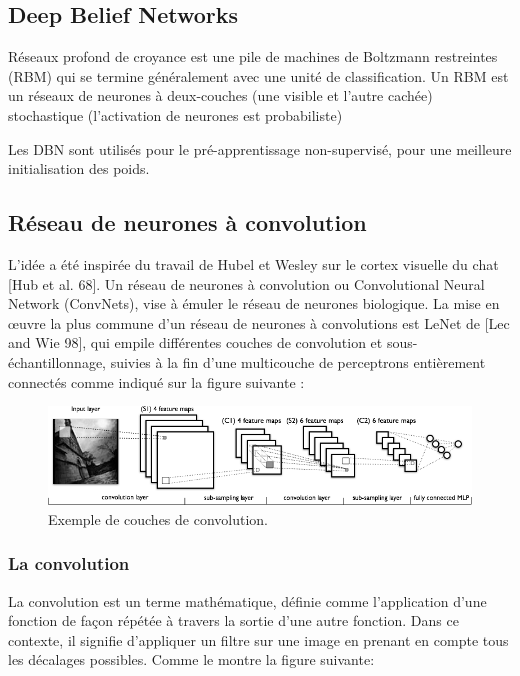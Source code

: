 \subsection{Deep Belief Networks}

Réseaux profond de croyance est une pile de machines de Boltzmann restreintes (RBM) qui se termine généralement avec une unité de classification. Un RBM est un réseaux de neurones à deux-couches (une visible et l'autre cachée) stochastique (l'activation de neurones est probabiliste)

Les DBN sont utilisés pour le pré-apprentissage non-supervisé, pour une meilleure initialisation des poids.



\subsection{Réseau de neurones à convolution}
L'idée a été inspirée du travail de Hubel et Wesley sur le cortex visuelle du chat [Hub et al. 68]. Un réseau de neurones à convolution ou Convolutional Neural Network (ConvNets), vise à émuler le réseau de neurones biologique.
	La mise en œuvre la plus commune d'un réseau de neurones à convolutions est LeNet de [Lec and Wie 98], qui empile différentes couches de convolution et sous-échantillonnage, suivies à la fin d'une multicouche de perceptrons entièrement connectés comme indiqué sur la figure suivante :

\begin{figure}[H]
	\centering
		\includegraphics[width=5in]{Figures/Mylenet.png}
	\caption[An Electron]{Exemple de couches de convolution.}
	\label{fig:Electron}
\end{figure}


\subsubsection{La convolution}
La convolution est un terme mathématique, définie comme l'application d'une fonction de façon répétée à travers la sortie d'une autre fonction. Dans ce contexte, il signifie d'appliquer un filtre sur une image en prenant en compte tous les décalages possibles. Comme le montre la figure suivante:


